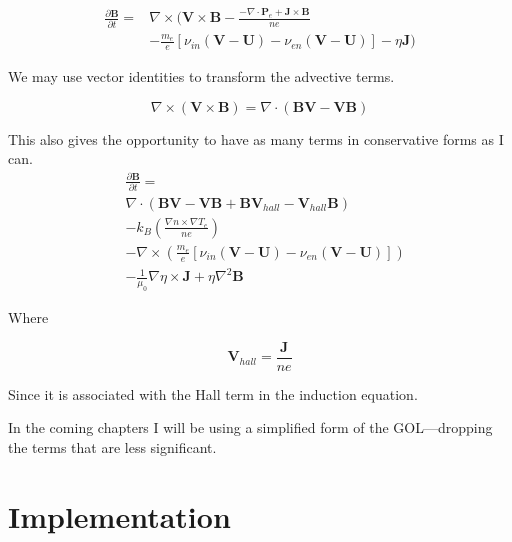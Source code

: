 \documentclass[12pt,upcase]{umlthesis}
\begin{document}
\begin{equation}
	\begin{aligned}
		\frac{\partial\textbf{B}}{\partial t} =& \nabla\times(\textbf{V}\times\textbf{B} - \frac{-\nabla\cdot\textbf{P}_e + \textbf{J}\times\textbf{B}}{ne} \\
						       &- \frac{m_e}{e}[\nu_{in} (\textbf{V}-\textbf{U}) - \nu_{en}(\textbf{V} - \textbf{U})] - \eta\textbf{J})
\end{aligned}
\end{equation}

We may use vector identities to transform the advective terms.

\begin{equation}
	\nabla\times(\textbf{V}\times\textbf{B}) = \nabla\cdot(\textbf{BV}-\textbf{VB})
\end{equation}

This also gives the opportunity to have as many terms in conservative forms as I can.
\begin{equation}\label{eq:inductionequation}
	\begin{aligned}
		& \frac{\partial\textbf{B}}{\partial t} = \\
		&\nabla\cdot(\textbf{BV}-\textbf{VB} + \textbf{B}\textbf{V}_{hall}-\textbf{V}_{hall}\textbf{B}) \\
		&-k_B (\frac{\nabla n \times \nabla T_e}{ne}) \\
		&- \nabla\times(\frac{m_e}{e}[\nu_{in} (\textbf{V}-\textbf{U}) - \nu_{en}(\textbf{V} - \textbf{U})]) \\
		& - \frac{1}{\mu_0} \nabla\eta\times\textbf{J} + \eta\nabla^2\textbf{B}
\end{aligned}
\end{equation}

Where

\begin{equation}
	\textbf{V}_{hall} = \frac{\textbf{J}}{ne}
\end{equation}

Since it is associated with the Hall term in the induction equation.

In the coming chapters I will be using a simplified form of the GOL---dropping the terms that are less significant.

\chapter{Implementation}\label{chap:implementation}
\end{document}
